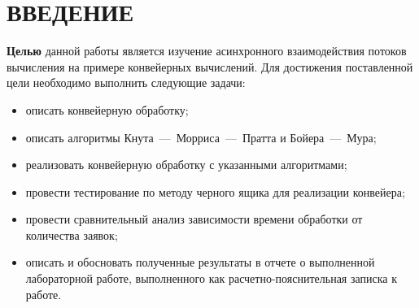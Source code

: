 \chapter*{ВВЕДЕНИЕ}

\textbf{Целью} данной работы является изучение асинхронного взаимодействия потоков вычисления на примере конвейерных вычислений. Для достижения поставленной цели необходимо выполнить следующие задачи:
\begin{itemize}[label=---]
	\item описать конвейерную обработку;
	\item описать алгоритмы Кнута~---~Морриса~---~Пратта и Бойера~---~Мура;
	\item реализовать конвейерную обработку с указанными алгоритмами;
	
	\item провести тестирование по методу черного ящика для реализации конвейера;
	
	\item провести сравнительный анализ зависимости времени обработки от количества заявок;
	
	\item описать и обосновать полученные результаты в отчете о выполненной лабораторной работе, выполненного как расчетно-пояснительная записка к работе.
\end{itemize}